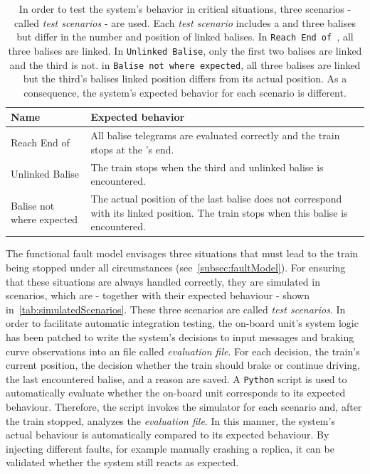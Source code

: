 \begin{table}[h!]
	\begin{center}
		\caption{In order to test the system's behavior in critical situations, three scenarios - called \textit{test scenarios} - are used. Each \textit{test scenario} includes a  and three balises but differ in the number and position of linked balises. In \texttt{Reach End of }, all three balises are linked. In \texttt{Unlinked Balise}, only the first two balises are linked and the third is not. in \texttt{Balise not where expected}, all three balises are linked but the third's balises linked position differs from its actual position. As a consequence, the system's expected behavior for each scenario is different.}
		\label{tab:simulatedScenarios}
		\begin{tabularx}{\textwidth}{|X|X|}
			\hline
			\textbf{Name} & \textbf{Expected behavior}\\
			\hline \hline
			Reach End of \abr{MA} & All balise telegrams are evaluated correctly and the train stops at the \abr{MA}'s end. \\
			\hline
			Unlinked Balise & The train stops when the third and unlinked balise is encountered. \\
			\hline
			Balise not where expected & The actual position of the last balise does not correspond with its linked position. The train stops when this balise is encountered. \\
			\hline
		\end{tabularx}
	\end{center}
\end{table}


The functional fault model envisages three situations that must lead to the train being stopped under all circumstances (see~\autoref{subsec:faultModel}).
For ensuring that these situations are always handled correctly, they are simulated in scenarios, which are - together with their expected behaviour - shown in~\autoref{tab:simulatedScenarios}.
These three scenarios are called \textit{test scenarios}.
In order to facilitate automatic integration testing, the on-board unit's system logic has been patched to write the system's decisions to input messages and braking curve observations into an file called \textit{evaluation file}.
For each decision, the train's current position, the decision whether the train should brake or continue driving, the last encountered balise, and a reason are saved.
A \texttt{Python} script is used to automatically evaluate whether the on-board unit corresponds to its expected behaviour.
Therefore, the script invokes the simulator for each scenario and, after the train stopped, analyzes the \textit{evaluation file}.
In this manner, the system's actual behaviour is automatically compared to its expected behaviour.
By injecting different faults, for example manually crashing a replica, it can be validated whether the system still reacts as expected.



